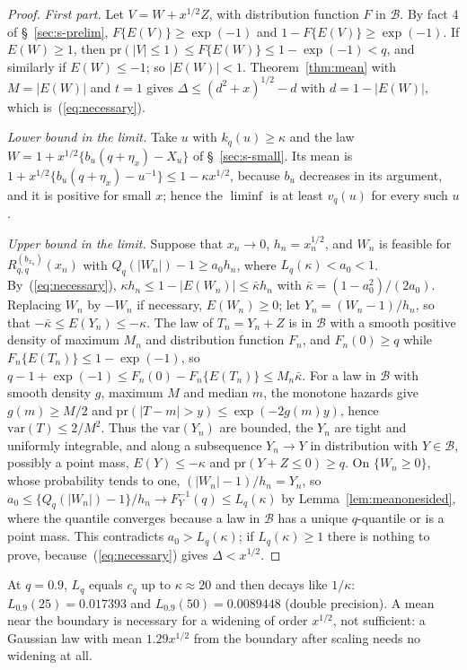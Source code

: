 \documentclass[12pt]{article}
\renewcommand{\_}{\usc\allowbreak}
\theoremstyle{definition}
\numberwithin{equation}{section}
\newcommand{\pr}{\mathrm{pr}}
\newcommand{\B}{\mathcal{B}}
\newcommand{\var}{\mathrm{var}}
\begin{document}
\begin{proof}
\emph{First part.} Let $V = W + x^{1/2}Z$, with distribution function $F$ in $\B$. By fact 4 of \S~\ref{sec:s-prelim}, $F\{E(V)\} \ge \exp(-1)$ and $1 - F\{E(V)\} \ge \exp(-1)$. If $E(W) \ge 1$, then $\pr(|V| \le 1) \le F\{E(W)\} \le 1 - \exp(-1) < q$, and similarly if $E(W) \le -1$; so $|E(W)| < 1$. Theorem~\ref{thm:mean} with $M = |E(W)|$ and $t = 1$ gives $\Delta \le (d^2 + x)^{1/2} - d$ with $d = 1 - |E(W)|$, which is~(\ref{eq:necessary}).

\emph{Lower bound in the limit.} Take $u$ with $k_q(u) \ge \kappa$ and the law $W = 1 + x^{1/2}\{b_u(q + \eta_x) - X_u\}$ of \S~\ref{sec:s-small}. Its mean is $1 + x^{1/2}\{b_u(q + \eta_x) - u^{-1}\} \le 1 - \kappa x^{1/2}$, because $b_u$ decreases in its argument, and it is positive for small $x$; hence the $\liminf$ is at least $v_q(u)$ for every such $u$.

\emph{Upper bound in the limit.} Suppose that $x_n \to 0$, $h_n = x_n^{1/2}$, and $W_n$ is feasible for $R^{(b_{x_n})}_{q,q}(x_n)$ with $Q_q(|W_n|) - 1 \ge a_0h_n$, where $L_q(\kappa) < a_0 < 1$. By~(\ref{eq:necessary}), $\kappa h_n \le 1 - |E(W_n)| \le \bar\kappa h_n$ with $\bar\kappa = (1 - a_0^2)/(2a_0)$. Replacing $W_n$ by $-W_n$ if necessary, $E(W_n) \ge 0$; let $Y_n = (W_n - 1)/h_n$, so that $-\bar\kappa \le E(Y_n) \le -\kappa$. The law of $T_n = Y_n + Z$ is in $\B$ with a smooth positive density of maximum $M_n$ and distribution function $F_n$, and $F_n(0) \ge q$ while $F_n\{E(T_n)\} \le 1 - \exp(-1)$, so $q - 1 + \exp(-1) \le F_n(0) - F_n\{E(T_n)\} \le M_n\bar\kappa$. For a law in $\B$ with smooth density $g$, maximum $M$ and median $m$, the monotone hazards give $g(m) \ge M/2$ and $\pr(|T - m| > y) \le \exp(-2g(m)y)$, hence $\var(T) \le 2/M^2$. Thus the $\var(Y_n)$ are bounded, the $Y_n$ are tight and uniformly integrable, and along a subsequence $Y_n \to Y$ in distribution with $Y \in \B$, possibly a point mass, $E(Y) \le -\kappa$ and $\pr(Y + Z \le 0) \ge q$. On $\{W_n \ge 0\}$, whose probability tends to one, $(|W_n| - 1)/h_n = Y_n$, so $a_0 \le \{Q_q(|W_n|) - 1\}/h_n \to F_Y^{-1}(q) \le L_q(\kappa)$ by Lemma~\ref{lem:meanonesided}, where the quantile converges because a law in $\B$ has a unique $q$-quantile or is a point mass. This contradicts $a_0 > L_q(\kappa)$; if $L_q(\kappa) \ge 1$ there is nothing to prove, because~(\ref{eq:necessary}) gives $\Delta < x^{1/2}$.
\end{proof}

At $q = 0.9$, $L_q$ equals $c_q$ up to $\kappa \approx 20$ and then decays like $1/\kappa$: $L_{0.9}(25) = 0.017393$ and $L_{0.9}(50) = 0.0089448$ (double precision). A mean near the boundary is necessary for a widening of order $x^{1/2}$, not sufficient: a Gaussian law with mean $1.29x^{1/2}$ from the boundary after scaling needs no widening at all.
\end{document}

